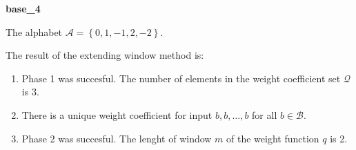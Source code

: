 \begin{exmp}
\textbf{ base\_4 }

\label{ex:base4}

The alphabet $\mathcal{A} =\left\{0, 1, -1, 2, -2\right\}$.

The result of the extending window method is:
\begin{enumerate}
    \item Phase 1 was succesful.
The number of elements in the weight coefficient set $\mathcal{Q}$ is $3$.

    \item There is a unique weight coefficient for input $b,b,\dots,b$ for all $b\in\mathcal{B}$.

    \item Phase 2 was succesful.
The lenght of window $m$ of the weight function $q$ is 2.
\end{enumerate}
\end{exmp}
